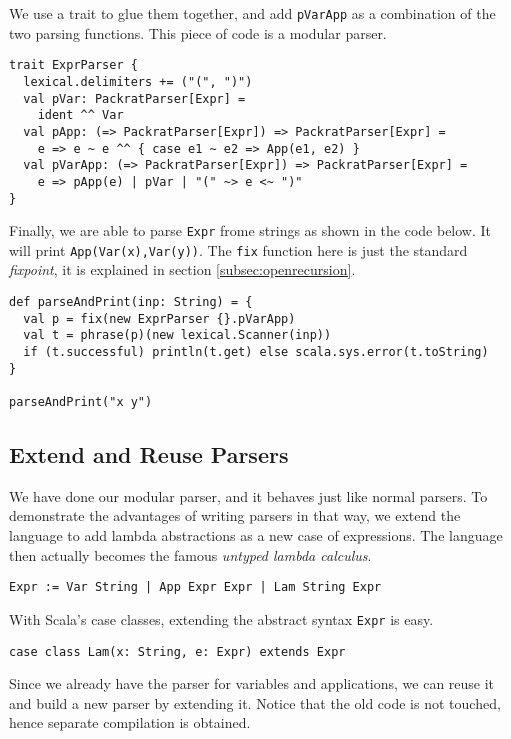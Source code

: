 We use a trait to glue them together, and add \lstinline{pVarApp} as a combination of the two parsing functions. This piece of code is a modular parser.

\begin{lstlisting}
trait ExprParser {
  lexical.delimiters += ("(", ")")
  val pVar: PackratParser[Expr] =
    ident ^^ Var
  val pApp: (=> PackratParser[Expr]) => PackratParser[Expr] =
    e => e ~ e ^^ { case e1 ~ e2 => App(e1, e2) }
  val pVarApp: (=> PackratParser[Expr]) => PackratParser[Expr] =
    e => pApp(e) | pVar | "(" ~> e <~ ")"
}
\end{lstlisting}

Finally, we are able to parse \lstinline{Expr} frome strings as shown in the code below. It will print \lstinline{App(Var(x),Var(y))}. The \lstinline{fix} function here is just the standard \textit{fixpoint}, it is explained in section \ref{subsec:openrecursion}.

\begin{lstlisting}
def parseAndPrint(inp: String) = {
  val p = fix(new ExprParser {}.pVarApp)
  val t = phrase(p)(new lexical.Scanner(inp))
  if (t.successful) println(t.get) else scala.sys.error(t.toString)
}

parseAndPrint("x y")
\end{lstlisting}

\subsection{Extend and Reuse Parsers}\label{subsec:overview-extend}

We have done our modular parser, and it behaves just like normal parsers. To demonstrate the advantages of writing parsers in that way, we extend the language to add lambda abstractions as a new case of expressions. The language then actually becomes the famous \textit{untyped lambda calculus}.

\begin{lstlisting}[language=PlainCode]
Expr := Var String | App Expr Expr | Lam String Expr
\end{lstlisting}

With Scala's case classes, extending the abstract syntax \lstinline{Expr} is easy.

\begin{lstlisting}
case class Lam(x: String, e: Expr) extends Expr
\end{lstlisting}

Since we already have the parser for variables and applications, we can reuse it and build a new parser by extending it. Notice that the old code is not touched, hence separate compilation is obtained.

